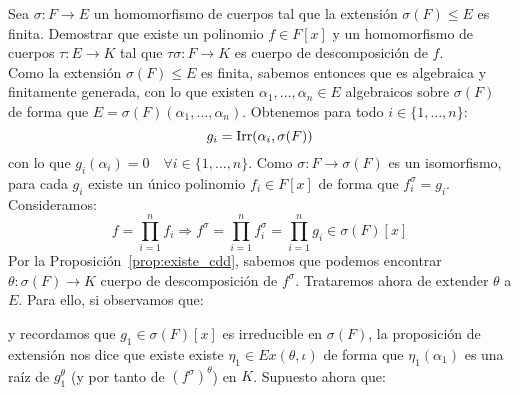 \begin{ejercicio}
    Sea $\sigma:F\to E$ un homomorfismo de cuerpos tal que la extensión $\sigma(F)\leq E$ es finita. Demostrar que existe un polinomio $f\in F[x]$ y un homomorfismo de cuerpos $\tau:E\to K$ tal que $\tau\sigma:F\to K$ es cuerpo de descomposición de $f$.\\

    \noindent
    Como la extensión $\sigma(F)\leq E$ es finita, sabemos entonces que es algebraica y finitamente generada, con lo que existen $\alpha_1, \ldots, \alpha_n\in E$ algebraicos sobre $\sigma(F)$ de forma que $E = \sigma(F)(\alpha_1, \ldots, \alpha_n)$. Obtenemos para todo $i \in \{1,\ldots,n\}$:
    \begin{equation*}
        g_i = \operatorname{Irr}(\alpha_i, \sigma(F))
    \end{equation*}
    con lo que $g_i(\alpha_i)=0\quad \forall i \in \{1,\ldots,n\}$. Como $\sigma:F\to\sigma(F)$ es un isomorfismo, para cada $g_i$ existe un único polinomio $f_i \in F[x]$ de forma que $f_i^\sigma=g_i$. Consideramos:
    \begin{equation*}
        f = \prod_{i=1}^{n} f_i \Longrightarrow f^\sigma =\prod_{i=1}^{n}f_i^\sigma= \prod_{i=1}^{n}g_i \in \sigma(F)[x]
    \end{equation*}
    Por la Proposición~\ref{prop:existe_cdd}, sabemos que podemos encontrar $\theta:\sigma(F)\to K$ cuerpo de descomposición de $f^{\sigma}$. Trataremos ahora de extender $\theta$ a $E$. Para ello, si observamos que:
    \begin{figure}[H]
        \centering
    \end{figure}
    \noindent
    y recordamos que $g_1\in \sigma(F)[x]$ es irreducible en $\sigma(F)$, la proposición de extensión nos dice que existe existe $\eta_1 \in Ex(\theta,\iota)$ de forma que $\eta_1(\alpha_1)$ es una raíz de $g_1^\theta$ (y por tanto de ${(f^\sigma)}^{\theta}$) en $K$. Supuesto ahora que:
    \begin{figure}[H]
        \centering
\end{figure}
\end{ejercicio}
